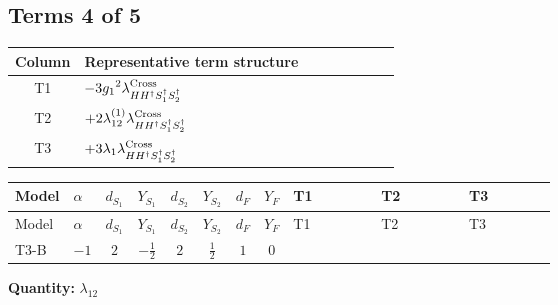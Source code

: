 \documentclass[8pt]{article}
\begin{document}
\begin{landscape}
\subsection*{Terms 4 of 5}
\begin{center}
\begin{tabular}{@{}c >{\raggedright\arraybackslash}p{0.82\linewidth}@{}}
\toprule
Column & Representative term structure \\
\midrule
T1 & \(\displaystyle -3 {g_1}^2 {\lambda_{H H^\dagger S_1^\dagger S_2^\dagger}^{\rm Cross}}\) \\
\midrule
T2 & \(\displaystyle +2 {\lambda_{12}^{(1)}} {\lambda_{H H^\dagger S_1^\dagger S_2^\dagger}^{\rm Cross}}\) \\
\midrule
T3 & \(\displaystyle +3 {\lambda_1} {\lambda_{H H^\dagger S_1^\dagger S_2^\dagger}^{\rm Cross}}\) \\
\midrule
\bottomrule
\end{tabular}
\end{center}
\smallskip
\tiny
\begin{longtable}{@{}llcccccc >{\raggedright\arraybackslash}p{0.21\linewidth} >{\raggedright\arraybackslash}p{0.21\linewidth} >{\raggedright\arraybackslash}p{0.21\linewidth}@{}}
\toprule
Model & $\alpha$ & $d_{S_1}$ & $Y_{S_1}$ & $d_{S_2}$ & $Y_{S_2}$ & $d_F$ & $Y_F$ & T1 & T2 & T3 \\
\midrule
\endfirsthead
\toprule
Model & $\alpha$ & $d_{S_1}$ & $Y_{S_1}$ & $d_{S_2}$ & $Y_{S_2}$ & $d_F$ & $Y_F$ & T1 & T2 & T3 \\
\midrule
\endhead
T3-B & $-1$ & $2$ & $-\frac{1}{2}$ & $2$ & $\frac{1}{2}$ & $1$ & $0$ & \scriptsize\adjustbox{max width=\linewidth}{$\begin{gathered} -3 {g_1}^2 {\lambda_{H H^\dagger S_1^\dagger S_2^\dagger}^{\rm Cross}}\end{gathered}$} & \scriptsize\adjustbox{max width=\linewidth}{$\begin{gathered} +2 {\lambda_{12}^{(1)}} {\lambda_{H H^\dagger S_1^\dagger S_2^\dagger}^{\rm Cross}}\end{gathered}$} & \scriptsize\adjustbox{max width=\linewidth}{$\begin{gathered} +3 {\lambda_1} {\lambda_{H H^\dagger S_1^\dagger S_2^\dagger}^{\rm Cross}}\end{gathered}$} \\
\midrule
\bottomrule
\end{longtable}
\clearpage
\noindent\textbf{Quantity: }$\lambda_{12}$\par\smallskip

\end{landscape}
\end{document}
